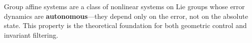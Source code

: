 \documentclass[../AAE590LGM_HW3.tex]{subfiles}
\begin{document}
Group affine systems are a class of nonlinear systems on Lie groups whose error dynamics are \textbf{autonomous}---they depend only on the error, not on the absolute state. This property is the theoretical foundation for both geometric control and invariant filtering.
\end{document}
